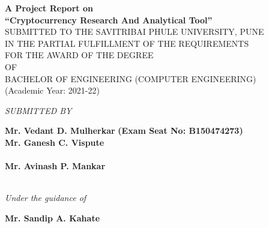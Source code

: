 \documentclass[openany,12pt]{report}
\begin{document}


 
\lhead{}
\chead{}
\setlength{\headrulewidth}{0.4pt}
\setlength{\footrulewidth}{0.4pt}
\fontsize{12}{15}
\begin{titlepage}
\begin{center}
{\bf A Project Report on} \\
\vspace{0.3in}
{\Large \bf ``Cryptocurrency Research And Analytical Tool''}\\
\vspace{0.3in}
SUBMITTED TO THE SAVITRIBAI PHULE UNIVERSITY, PUNE\\
IN THE PARTIAL FULFILLMENT OF THE REQUIREMENTS \\
FOR THE AWARD OF THE DEGREE \\
\vspace{0.2in}
OF\\  
\vspace{0.2in}
BACHELOR OF ENGINEERING (COMPUTER ENGINEERING)\\
(Academic Year: 2021-22)\\
\vspace{0.2in}

{\it SUBMITTED BY}\\

\vspace{0.2in}

{\bf Mr. Vedant D. Mulherkar}\hspace{0.32in} {\bf (Exam Seat No: B150474273)} \\

{\bf Mr. Ganesh C. Vispute     }\hspace{0.5in}{\bf (Exam Seat No: B150474318)}\\  \\
{\bf Mr. Avinash P. Mankar    }\hspace{0.43in}{\bf (Exam Seat No: B150474201)}\\  \\

\vspace{0.4in}

{\it Under the guidance of}\\

\vspace{0.1in}

{\bf Mr. Sandip A. Kahate}\\
\vspace{0.4in}



\end{center}
\end{titlepage}
\end{document}
